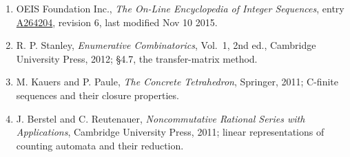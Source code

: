\documentclass[11pt]{article}
\theoremstyle{definition}
\begin{document}
\begin{enumerate}

\item OEIS Foundation Inc., \emph{The On-Line Encyclopedia of Integer Sequences}, entry \href{https://oeis.org/A264204}{A264204}, revision 6, last modified Nov 10 2015.

\item R. P. Stanley, \emph{Enumerative Combinatorics}, Vol.~1, 2nd ed., Cambridge University Press, 2012; \S4.7, the transfer-matrix method.

\item M. Kauers and P. Paule, \emph{The Concrete Tetrahedron}, Springer, 2011; C-finite sequences and their closure properties.

\item J. Berstel and C. Reutenauer, \emph{Noncommutative Rational Series with Applications}, Cambridge University Press, 2011; linear representations of counting automata and their reduction.

\end{enumerate}
\end{document}
